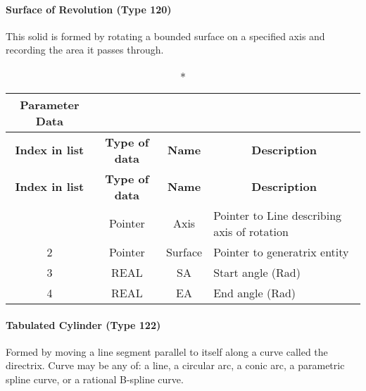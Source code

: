 \paragraph{Surface of Revolution (Type
120)}\label{surface-of-revolution-type-120}

This solid is formed by rotating a bounded surface on a specified axis
and recording the area it passes through.

\begin{longtable}[H]{|c|c|c|l|}
  \caption*{Parameter Data} \\

  \hline
  \multicolumn{1}{|c|}{\textbf{Index in list}} & \multicolumn{1}{|c|}{\textbf{Type of data}} &
  \multicolumn{1}{|c|}{\textbf{Name}} & \multicolumn{1}{|c|}{\textbf{Description}} \\ \hline
  \endfirsthead
  \hline
  \multicolumn{1}{|c|}{\textbf{Index in list}} & \multicolumn{1}{|c|}{\textbf{Type of data}} &
  \multicolumn{1}{|c|}{\textbf{Name}} & \multicolumn{1}{|c|}{\textbf{Description}} \\ \hline
  \endhead
  
  \endfoot

  \endlastfoot
1 & Pointer & Axis & Pointer to Line describing axis of
rotation\\ \hline
2 & Pointer & Surface & Pointer to generatrix entity\\ \hline
3 & REAL & SA & Start angle (Rad)\\ \hline
4 & REAL & EA & End angle (Rad)\\ \hline
\end{longtable}

\paragraph{Tabulated Cylinder (Type
122)}\label{tabulated-cylinder-type-122}

Formed by moving a line segment parallel to itself along a curve called
the directrix. Curve may be any of: a line, a circular arc, a conic arc,
a parametric spline curve, or a rational B-spline curve.

